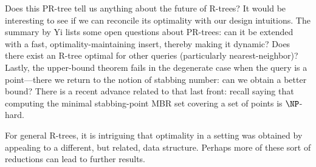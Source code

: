 Does this PR-tree tell us anything about the future of R-trees?
It would be interesting to see if we can reconcile its optimality with our design intuitions.
The summary by Yi \cite{yi12} lists some open questions about PR-trees: can it be extended with a fast, optimality-maintaining insert, thereby making it dynamic?
Does there exist an R-tree optimal for other queries (particularly nearest-neighbor)?
Lastly, the upper-bound theorem fails in the degenerate case when the query is a point---there we return to the notion of stabbing number: can we obtain a better bound?
There is a recent advance related to that last front: recall \cite{bergkhosraviverdonschotweele11} saying that computing the minimal stabbing-point MBR set covering a set of points is $\NP$-hard.

For general R-trees, it is intriguing that optimality in a setting was obtained by appealing to a different, but related, data structure.
Perhaps more of these sort of reductions can lead to further results.
